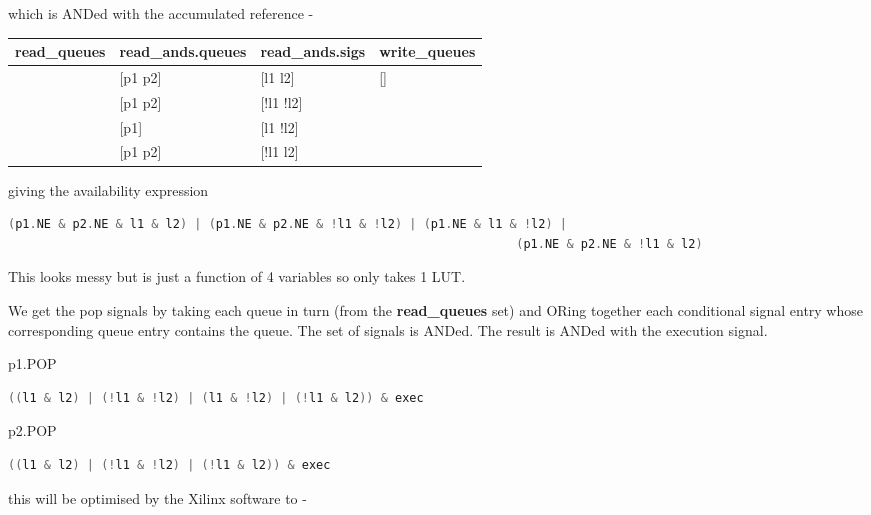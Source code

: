 \documentclass[10pt,a4paper,twoside,fleqn]{book}
\begin{document}
            which is ANDed with the accumulated reference -

            \begin{tabular}{| l | l | l | l |}
            \hline
            read\_queues  & read\_ands.queues & read\_ands.sigs & write\_queues    \\
            \hline
            [p1 p2]      & [p1 p2]          & [l1 l2]         & []              \\
                         & [p1 p2]          & [!l1 !l2]       &                 \\
                         & [p1]             & [l1 !l2]        &                 \\
                         & [p1 p2]          & [!l1 l2]        &                 \\
            \hline        
            \end{tabular}

            giving the availability expression

            \begin{lstlisting}[gobble=12, language=C]
                (p1.NE & p2.NE & l1 & l2) | (p1.NE & p2.NE & !l1 & !l2) | (p1.NE & l1 & !l2) |
                                                                       (p1.NE & p2.NE & !l1 & l2)
            \end{lstlisting}
            This looks messy but is just a function of 4 variables so only takes
            1 LUT.

            We get the pop signals by taking each queue in turn (from the {\bf
            read\_queues} set) and ORing together each conditional signal entry
            whose corresponding queue entry contains the queue. The set of signals
            is ANDed. The result is ANDed with the execution signal.

            p1.POP \\
            \begin{lstlisting}[gobble=12, language=C]
                ((l1 & l2) | (!l1 & !l2) | (l1 & !l2) | (!l1 & l2)) & exec
            \end{lstlisting}
            p2.POP \\
            \begin{lstlisting}[gobble=12, language=C]
                ((l1 & l2) | (!l1 & !l2) | (!l1 & l2)) & exec
            \end{lstlisting}

            this will be optimised by the Xilinx software to -
\end{document}
